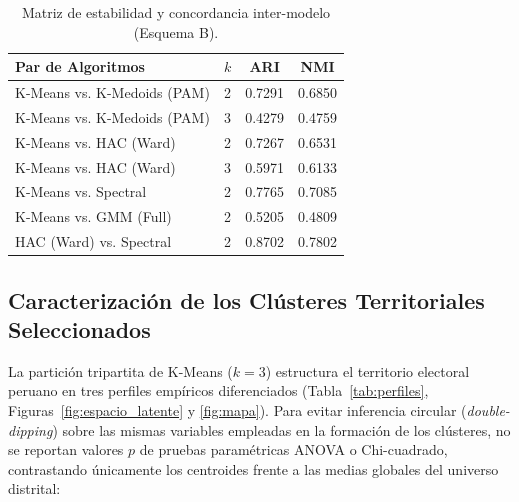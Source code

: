 \documentclass[conference,10pt,letterpaper]{IEEEtran}
\begin{document}
\begin{table}[htbp]
\centering
\caption{Matriz de estabilidad y concordancia inter-modelo (Esquema B).}
\label{tab:estabilidad}
\footnotesize
\begin{tabularx}{\columnwidth}{l c c c}
\toprule
\textbf{Par de Algoritmos} & \textbf{$k$} & \textbf{ARI} & \textbf{NMI} \\
\midrule
K-Means vs. K-Medoids (PAM) & 2 & 0.7291 & 0.6850 \\
K-Means vs. K-Medoids (PAM) & 3 & 0.4279 & 0.4759 \\
K-Means vs. HAC (Ward) & 2 & 0.7267 & 0.6531 \\
K-Means vs. HAC (Ward) & 3 & 0.5971 & 0.6133 \\
K-Means vs. Spectral & 2 & 0.7765 & 0.7085 \\
K-Means vs. GMM (Full) & 2 & 0.5205 & 0.4809 \\
HAC (Ward) vs. Spectral & 2 & 0.8702 & 0.7802 \\
\bottomrule
\end{tabularx}
\end{table}

\subsection{Caracterización de los Clústeres Territoriales Seleccionados}

La partición tripartita de K-Means ($k = 3$) estructura el territorio electoral peruano en tres perfiles empíricos diferenciados (Tabla~\ref{tab:perfiles}, Figuras~\ref{fig:espacio_latente} y \ref{fig:mapa}). Para evitar inferencia circular (\textit{double-dipping}) sobre las mismas variables empleadas en la formación de los clústeres, no se reportan valores $p$ de pruebas paramétricas ANOVA o Chi-cuadrado, contrastando únicamente los centroides frente a las medias globales del universo distrital:
\end{document}
